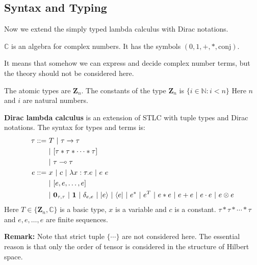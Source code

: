 \subsection{Syntax and Typing}

Now we extend the simply typed lambda calculus with Dirac notations.

\begin{postulate}
  $\mathbb{C}$ is an algebra for complex numbers. It has the symbols $(0, 1, +, *, \textrm{conj})$.
\end{postulate}
It means that somehow we can express and decide complex number terms, but the theory should not be considered here.

\begin{definition}
  The atomic types are $\mathbf{Z}_n$.
  The constants of the type $\mathbf{Z}_n$ is $\{i \in \mathbb{N} : i<n\}$
  Here $n$ and $i$ are natural numbers.
\end{definition}


\begin{definition}
  \textbf{Dirac lambda calculus} is an extension of STLC with tuple types and Dirac notations. The syntax for types and terms is:
  \begin{align*}
    \tau ::=&\ T\ |\ \tau \to \tau\\
      &\ |\ [ \tau *\tau*\cdots * \tau ] \\
      &\ |\ \tau \multimap \tau\\
    e ::=&\ x\ |\ c\ |\ \lambda x : \tau. e\ |\ e\ e\\
      &\ |\ [e, e, \dots, e] \\
      &\ |\ \mathbf{0}_{\tau, \tau}\ |\ \mathbf{1}\ |\ \delta_{e, e}\ |\ |e\rangle\ |\ \langle e|\ |\ e^*\ |\ e^T\ |\ e * e\ |\ e + e\ |\ e \cdot e\ |\ e \otimes e
  \end{align*}
  Here $T \in \{\mathbf{Z}_n, \mathbb{C}\}$ is a basic type, $x$ is a variable and $c$ is a constant. $\tau *\tau*\cdots * \tau$ and $e, e, \dots, e$ are finite sequences.
\end{definition}

\textbf{Remark: } Note that strict tuple $\{\cdots\}$ are not considered here. The essential reason is that only the order of tensor is considered in the structure of Hilbert space.

